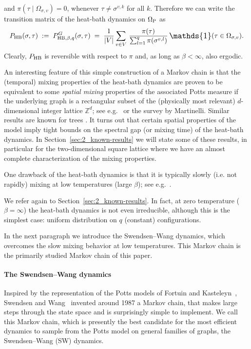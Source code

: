 \documentclass{dis}
\theoremstyle{citing}
\begin{document}
and $\pi(\tau\mid{\Omega}_{\sigma,v})=0$, whenever $\tau\neq\sigma^{v,k}$ 
for all $k$.
Therefore we can write the transition matrix of the 
heat-bath dynamics on ${\Omega}_{\rm P}$ as
\begin{equation}\label{eq:P-HB}
{P_{\rm HB}}(\sigma,\tau) 
\;:=\; P_{{\rm HB},\beta,q}^G(\sigma,\tau) \;=\;
\frac{1}{{\left\vert {V} \right\vert}}\sum_{v\in V}\,\frac{\pi(\tau)}
	{\sum_{l=1}^q\pi(\sigma^{v,l})}\,
	{\scalebox{1.2}{\raisebox{-0.2mm}{$\mathds{1}$}}}(\tau\in{\Omega}_{\sigma,v}).
\end{equation}
Clearly, $P_{\rm HB}$ is reversible with respect to $\pi$ and, 
as long as $\beta<\infty$, also ergodic. 

An interesting feature of this simple 
construction of a Markov chain is that the (temporal) mixing 
properties of the heat-bath dynamics are proven to be 
equivalent to some \emph{spatial mixing} 
properties of the associated Potts measure if the 
underlying graph is a rectangular subset of the (physically most relevant) 
$d$-dimensional integer lattice ${\ensuremath{\mathbb{Z}}}^d$; see 
e.g.~\cite{AizHol,DSVW,Holley,MO_finite-volume,MO1,MO2,MOS,SZ_equivalence}
or the survey \cite{M} by Martinelli. 
Similar results are known for trees \cite{MSW}.
It turns out that certain spatial properties of 
the model imply tight bounds on the spectral gap (or mixing time) 
of the heat-bath dynamics.
In Section~\ref{sec:2_known-results} we will state 
some of these results, in particular for the two-dimensional 
square lattice where we have an almost complete characterization 
of the mixing properties.

One drawback of the heat-bath dynamics is that it is 
typically slowly (i.e. not rapidly) mixing at low temperatures 
(large $\beta$); see e.g.~\cite{CGMS,CCS,LPW,Schonmann}. 

We refer again to Section~\ref{sec:2_known-results}.
In fact, at zero temperature ($\beta=\infty$) the heat-bath dynamics 
is not even irreducible, although this is the simplest case: 
uniform distribution on $q$ (constant) configurations.

In the next paragraph we introduce the Swendsen--Wang dynamics, 
which overcomes the slow mixing behavior at low temperatures.
This Markov chain is the primarily studied Markov chain of this paper.

\paragraph{\bf The Swendsen--Wang dynamics}  
Inspired by the representation of 
the Potts models of Fortuin and Kasteleyn~\cite{FK}, 
Swendsen and Wang~\cite{SW} invented around 1987 a Markov chain, 
that makes large 
steps through the state space
and is surprisingly simple to implement. 
We call this Markov chain, which is presently the best 
candidate for the most efficient dynamics to sample from the Potts 
model on general families of graphs, the 
Swendsen--Wang (SW) dynamics. 
\end{document}
